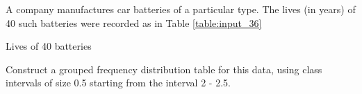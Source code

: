 A company manufactures car batteries of a particular type. The lives (in years) of 40 such batteries were recorded as in Table \ref{table:input_36}

\begin{table}[ht!]
\centering

\caption{Lives of 40 batteries}
\label{table:input_36}
\end{table}
Construct a grouped frequency distribution table for this data, using class intervals of size 0.5 starting from the interval 2 - 2.5.\\
